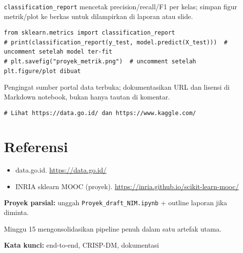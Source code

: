 \documentclass[../main.tex]{subfiles}
\begin{document}
\MulaiPenjelasanKode \texttt{classification\_report} mencetak precision/recall/F1 per kelas; simpan figur metrik/plot ke berkas untuk dilampirkan di laporan atau slide. \SelesaiPenjelasanKode

\begin{lstlisting}[caption=Metrik dan simpan figur]
from sklearn.metrics import classification_report
# print(classification_report(y_test, model.predict(X_test)))  # uncomment setelah model ter-fit
# plt.savefig("proyek_metrik.png")  # uncomment setelah plt.figure/plot dibuat
\end{lstlisting}

\MulaiPenjelasanKode Pengingat sumber portal data terbuka; dokumentasikan URL dan lisensi di Markdown notebook, bukan hanya tautan di komentar. \SelesaiPenjelasanKode

\begin{lstlisting}[caption=Sumber terbuka dataset]
# Lihat https://data.go.id/ dan https://www.kaggle.com/
\end{lstlisting}

\section{Referensi}

\begin{itemize}[leftmargin=*]
  \item data.go.id. \url{https://data.go.id/}
  \item INRIA sklearn MOOC (proyek). \url{https://inria.github.io/scikit-learn-mooc/}
\end{itemize}

\begin{asesmen}
\textbf{Proyek parsial:} unggah \texttt{Proyek\_draft\_NIM.ipynb} + outline laporan jika diminta.
\end{asesmen}

\begin{rangkuman}
Minggu 15 mengonsolidasikan pipeline penuh dalam satu artefak utama.

\textbf{Kata kunci:} end-to-end, CRISP-DM, dokumentasi
\end{rangkuman}
\end{document}
